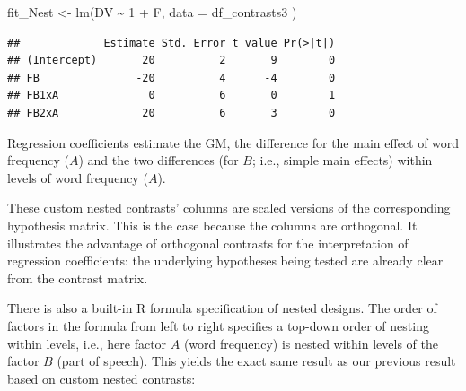 \documentclass[
  12pt,
]{krantz}
\newenvironment{Shaded}{\begin{snugshade}}{\end{snugshade}}
\newcommand{\AttributeTok}[1]{\textcolor[rgb]{0.77,0.63,0.00}{#1}}
\newcommand{\DecValTok}[1]{\textcolor[rgb]{0.00,0.00,0.81}{#1}}
\newcommand{\FloatTok}[1]{\textcolor[rgb]{0.00,0.00,0.81}{#1}}
\newcommand{\FunctionTok}[1]{\textcolor[rgb]{0.00,0.00,0.00}{#1}}
\newcommand{\NormalTok}[1]{#1}
\newcommand{\OtherTok}[1]{\textcolor[rgb]{0.56,0.35,0.01}{#1}}
\newcommand{\SpecialCharTok}[1]{\textcolor[rgb]{0.00,0.00,0.00}{#1}}
\theoremstyle{definition}
\theoremstyle{definition}
\theoremstyle{definition}
\theoremstyle{definition}
\theoremstyle{remark}
\begin{document}
\begin{Shaded}
\begin{Highlighting}[]
\NormalTok{fit\_Nest }\OtherTok{\textless{}{-}} \FunctionTok{lm}\NormalTok{(DV }\SpecialCharTok{\textasciitilde{}} \DecValTok{1} \SpecialCharTok{+}\NormalTok{ F,}
  \AttributeTok{data =}\NormalTok{ df\_contrasts3}
\NormalTok{)}
\end{Highlighting}
\end{Shaded}

\begin{Shaded}
\end{Shaded}

\begin{verbatim}
##             Estimate Std. Error t value Pr(>|t|)
## (Intercept)       20          2       9        0
## FB               -20          4      -4        0
## FB1xA              0          6       0        1
## FB2xA             20          6       3        0
\end{verbatim}

Regression coefficients estimate the GM, the difference for the main effect of word frequency (\(A\)) and the two differences (for \(B\); i.e., simple main effects) within levels of word frequency (\(A\)).

These custom nested contrasts' columns are scaled versions of the corresponding hypothesis matrix. This is the case because the columns are orthogonal. It illustrates the advantage of orthogonal contrasts for the interpretation of regression coefficients: the underlying hypotheses being tested are already clear from the contrast matrix.

There is also a built-in R formula specification of nested designs. The order of factors in the formula from left to right specifies a top-down order of nesting within levels, i.e., here factor \(A\) (word frequency) is nested within levels of the factor \(B\) (part of speech). This yields the exact same result as our previous result based on custom nested contrasts:

\begin{Shaded}
\end{Shaded}
\end{document}
